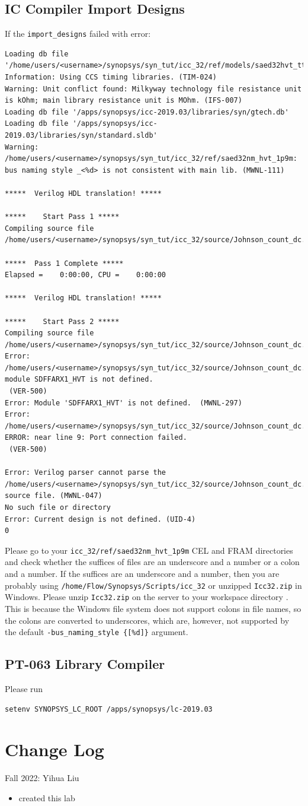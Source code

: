 \documentclass[a4paper,12pt,twoside]{article}
\begin{document}
\subsection{IC Compiler Import Designs}\label{AImp}
If the \texttt{import\_designs} failed with error:
\begin{verbatim}
Loading db file '/home/users/<username>/synopsys/syn_tut/icc_32/ref/models/saed32hvt_tt1p05v25c.db'
Information: Using CCS timing libraries. (TIM-024)
Warning: Unit conflict found: Milkyway technology file resistance unit is kOhm; main library resistance unit is MOhm. (IFS-007)
Loading db file '/apps/synopsys/icc-2019.03/libraries/syn/gtech.db'
Loading db file '/apps/synopsys/icc-2019.03/libraries/syn/standard.sldb'
Warning: /home/users/<username>/synopsys/syn_tut/icc_32/ref/saed32nm_hvt_1p9m: bus naming style _<%d> is not consistent with main lib. (MWNL-111)

*****  Verilog HDL translation! *****

*****    Start Pass 1 *****
Compiling source file /home/users/<username>/synopsys/syn_tut/icc_32/source/Johnson_count_dc.v

*****  Pass 1 Complete *****
Elapsed =    0:00:00, CPU =    0:00:00

*****  Verilog HDL translation! *****

*****    Start Pass 2 *****
Compiling source file /home/users/<username>/synopsys/syn_tut/icc_32/source/Johnson_count_dc.v
Error:   /home/users/<username>/synopsys/syn_tut/icc_32/source/Johnson_count_dc.v:9:  module SDFFARX1_HVT is not defined.
 (VER-500)
Error: Module 'SDFFARX1_HVT' is not defined.  (MWNL-297)
Error:   /home/users/<username>/synopsys/syn_tut/icc_32/source/Johnson_count_dc.v:9: ERROR: near line 9: Port connection failed.
 (VER-500)

Error: Verilog parser cannot parse the /home/users/<username>/synopsys/syn_tut/icc_32/source/Johnson_count_dc.v source file. (MWNL-047)
No such file or directory
Error: Current design is not defined. (UID-4)
0
\end{verbatim}
Please go to your \texttt{icc\_32/ref/saed32nm\_hvt\_1p9m} CEL and FRAM directories and check whether the suffices of files are an underscore and a number or a colon and a number. If the suffices are an underscore and a number, then you are probably using \texttt{/home/Flow/Synopsys/Scripts/icc\_32} or unzipped \texttt{Icc32.zip} in Windows. Please unzip \texttt{Icc32.zip} on the server to your workspace directory \cite{iccerror}. This is because the Windows file system does not support colons in file names, so the colons are converted to underscores, which are, however, not supported by the default \verb|-bus_naming_style {[%d]}| argument.
\subsection{PT-063 Library Compiler}\label{ALC}
Please run \cite{lcerror}
\begin{verbatim}
setenv SYNOPSYS_LC_ROOT /apps/synopsys/lc-2019.03
\end{verbatim}

\section{Change Log}
Fall 2022: Yihua Liu
\begin{itemize}
    \item created this lab
\end{itemize}

\printbibliography
\end{document}
